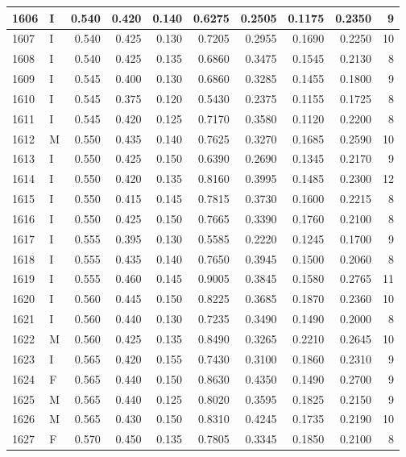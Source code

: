 \documentclass[9pt,twocolumn,twoside,]{pnas-new}
\begin{document}
\begin{tabular}{l|l|r|r|r|r|r|r|r|r}
\hline
1606 & I & 0.540 & 0.420 & 0.140 & 0.6275 & 0.2505 & 0.1175 & 0.2350 & 9\\
\hline
1607 & I & 0.540 & 0.425 & 0.130 & 0.7205 & 0.2955 & 0.1690 & 0.2250 & 10\\
\hline
1608 & I & 0.540 & 0.425 & 0.135 & 0.6860 & 0.3475 & 0.1545 & 0.2130 & 8\\
\hline
1609 & I & 0.545 & 0.400 & 0.130 & 0.6860 & 0.3285 & 0.1455 & 0.1800 & 9\\
\hline
1610 & I & 0.545 & 0.375 & 0.120 & 0.5430 & 0.2375 & 0.1155 & 0.1725 & 8\\
\hline
1611 & I & 0.545 & 0.420 & 0.125 & 0.7170 & 0.3580 & 0.1120 & 0.2200 & 8\\
\hline
1612 & M & 0.550 & 0.435 & 0.140 & 0.7625 & 0.3270 & 0.1685 & 0.2590 & 10\\
\hline
1613 & I & 0.550 & 0.425 & 0.150 & 0.6390 & 0.2690 & 0.1345 & 0.2170 & 9\\
\hline
1614 & I & 0.550 & 0.420 & 0.135 & 0.8160 & 0.3995 & 0.1485 & 0.2300 & 12\\
\hline
1615 & I & 0.550 & 0.415 & 0.145 & 0.7815 & 0.3730 & 0.1600 & 0.2215 & 8\\
\hline
1616 & I & 0.550 & 0.425 & 0.150 & 0.7665 & 0.3390 & 0.1760 & 0.2100 & 8\\
\hline
1617 & I & 0.555 & 0.395 & 0.130 & 0.5585 & 0.2220 & 0.1245 & 0.1700 & 9\\
\hline
1618 & I & 0.555 & 0.435 & 0.140 & 0.7650 & 0.3945 & 0.1500 & 0.2060 & 8\\
\hline
1619 & I & 0.555 & 0.460 & 0.145 & 0.9005 & 0.3845 & 0.1580 & 0.2765 & 11\\
\hline
1620 & I & 0.560 & 0.445 & 0.150 & 0.8225 & 0.3685 & 0.1870 & 0.2360 & 10\\
\hline
1621 & I & 0.560 & 0.440 & 0.130 & 0.7235 & 0.3490 & 0.1490 & 0.2000 & 8\\
\hline
1622 & M & 0.560 & 0.425 & 0.135 & 0.8490 & 0.3265 & 0.2210 & 0.2645 & 10\\
\hline
1623 & I & 0.565 & 0.420 & 0.155 & 0.7430 & 0.3100 & 0.1860 & 0.2310 & 9\\
\hline
1624 & F & 0.565 & 0.440 & 0.150 & 0.8630 & 0.4350 & 0.1490 & 0.2700 & 9\\
\hline
1625 & M & 0.565 & 0.440 & 0.125 & 0.8020 & 0.3595 & 0.1825 & 0.2150 & 9\\
\hline
1626 & M & 0.565 & 0.430 & 0.150 & 0.8310 & 0.4245 & 0.1735 & 0.2190 & 10\\
\hline
1627 & F & 0.570 & 0.450 & 0.135 & 0.7805 & 0.3345 & 0.1850 & 0.2100 & 8\\

\end{tabular}
\end{document}
